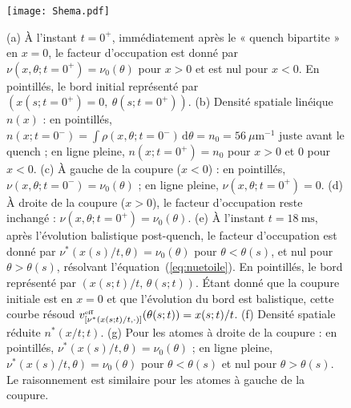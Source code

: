 \begin{figure}[H]
	\centering
	\texttt{[image: Shema.pdf]}
	\label{fig:BiPart.coupure1}
	\caption{
(a) À l'instant $t = 0^+$, immédiatement après le « quench bipartite » en $x = 0$, le facteur d'occupation est donné par $\nu(x, \theta ; t = 0^+) = \nu_0(\theta)$ pour $x > 0$ et est nul pour $x < 0$. En pointillés, le bord initial représenté par $(x(s; t = 0^+) = 0,\ \theta(s; t = 0^+))$.
(b) Densité spatiale linéique $n(x)$ : en pointillés, $n(x; t = 0^-) = \int \rho(x, \theta; t = 0^-) \, \mathrm{d}\theta = n_0 = 56~\mu\mathrm{m}^{-1}$ juste avant le quench ; en ligne pleine, $n(x; t = 0^+) = n_0$ pour $x > 0$ et $0$ pour $x < 0$.
(c) À gauche de la coupure ($x < 0$) : en pointillés, $\nu(x, \theta ; t = 0^-) = \nu_0(\theta)$ ; en ligne pleine, $\nu(x, \theta ; t = 0^+) = 0$.
(d) À droite de la coupure ($x > 0$), le facteur d'occupation reste inchangé : $\nu(x, \theta ; t = 0^+) = \nu_0(\theta)$.
(e) À l'instant $t = 18~\mathrm{ms}$, après l'évolution balistique post-quench, le facteur d'occupation est donné par $\nu^\ast(x(s)/t, \theta) = \nu_0(\theta)$ pour $\theta < \theta(s)$, et nul pour $\theta > \theta(s)$, résolvant l'équation~(\ref{eq:nuetoile}). En pointillés, le bord représenté par $(x(s; t)/t,\, \theta(s; t))$. Étant donné que la coupure initiale est en $x = 0$ et que l’évolution du bord est balistique, cette courbe résoud $v^{\mbox{\tiny eff}}_{[\nu^\ast(x(s; t)/t, \cdot) ]}(\theta(s; t)) = x(s; t)/t$.
(f) Densité spatiale réduite $n^\ast(x/t; t)$.
(g) Pour les atomes à droite de la coupure : en pointillés, $\nu^\ast(x(s)/t, \theta) = \nu_0(\theta)$ ; en ligne pleine, $\nu^\ast(x(s)/t, \theta) = \nu_0(\theta)$ pour $\theta < \theta(s)$ et nul pour $\theta > \theta(s)$. Le raisonnement est similaire pour les atomes à gauche de la coupure.
}
	
\end{figure}


